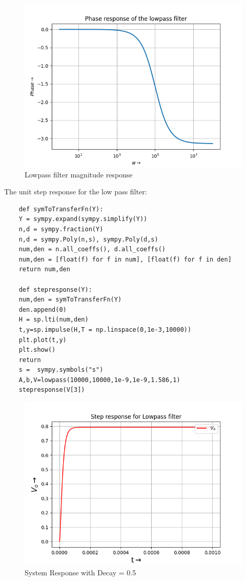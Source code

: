 \documentclass{article}
\begin{document}
\begin{figure}[h!]
	\centering
	\includegraphics[scale=0.6]{Figure_2.png}
	\caption{Lowpass filter magnitude response}
	\label{fig:Lowpass filter magnitude response}
\end{figure}


The unit step response for the low pass filter:


\begin{lstlisting}
	def symToTransferFn(Y):
	Y = sympy.expand(sympy.simplify(Y))
	n,d = sympy.fraction(Y)
	n,d = sympy.Poly(n,s), sympy.Poly(d,s)
	num,den = n.all_coeffs(), d.all_coeffs()
	num,den = [float(f) for f in num], [float(f) for f in den]
	return num,den
	
	def stepresponse(Y):
	num,den = symToTransferFn(Y)
	den.append(0)
	H = sp.lti(num,den)
	t,y=sp.impulse(H,T = np.linspace(0,1e-3,10000))
	plt.plot(t,y)
	plt.show() 
	return
	s =  sympy.symbols("s")
	A,b,V=lowpass(10000,10000,1e-9,1e-9,1.586,1)
	stepresponse(V[3])
\end{lstlisting}


\begin{figure}[h!]
	\centering
	\includegraphics[scale=0.6]{Figure_3}
	\caption{System Response with Decay = 0.5}
	\label{fig:System Response with Decay = 0.5}
\end{figure}
\end{document}
